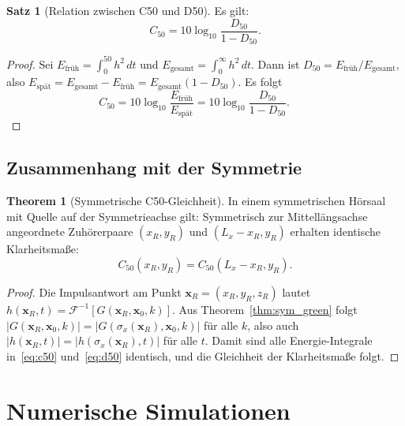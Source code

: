 ﻿\documentclass[12pt, a4paper]{article}
\theoremstyle{definition}
\newtheorem{satz}{Satz}[section]
\newtheorem{theorem}{Theorem}[section]
\theoremstyle{remark}
\newcommand{\Lx}{L_x}
\begin{document}
\begin{satz}[Relation zwischen C50 und D50]
\label{satz:c50_d50}
Es gilt:
\begin{equation}
  C_{50} = 10\log_{10}\frac{D_{50}}{1 - D_{50}}.
  \label{eq:c50_d50}
\end{equation}
\end{satz}

\begin{proof}
Sei $E_{\text{früh}} = \int_0^{50} h^2\,dt$ und $E_{\text{gesamt}} = \int_0^\infty h^2\,dt$.
Dann ist $D_{50} = E_{\text{früh}}/E_{\text{gesamt}}$, also
$E_{\text{spät}} = E_{\text{gesamt}} - E_{\text{früh}} = E_{\text{gesamt}}(1-D_{50})$.
Es folgt
\[
  C_{50} = 10\log_{10}\frac{E_{\text{früh}}}{E_{\text{spät}}}
  = 10\log_{10}\frac{D_{50}}{1-D_{50}}. \qquad 
\]
\end{proof}

\subsection{Zusammenhang mit der Symmetrie}

\begin{theorem}[Symmetrische C50-Gleichheit]
\label{thm:c50_sym}
In einem symmetrischen Hörsaal mit Quelle auf der Symmetrieachse gilt:
Symmetrisch zur Mittellängsachse angeordnete Zuhörerpaare
$(x_R, y_R) $ und $(\Lx - x_R, y_R)$ erhalten identische Klarheitsmaße:
\[
  C_{50}(x_R, y_R) = C_{50}(\Lx - x_R, y_R).
\]
\end{theorem}

\begin{proof}
Die Impulsantwort am Punkt $\mathbf{x}_R = (x_R, y_R, z_R)$ lautet
$h(\mathbf{x}_R, t) = \mathcal{F}^{-1}[G(\mathbf{x}_R, \mathbf{x}_0, k)]$.
Aus Theorem~\ref{thm:sym_green} folgt $|G(\mathbf{x}_R, \mathbf{x}_0,k)|
= |G(\sigma_x(\mathbf{x}_R), \mathbf{x}_0, k)|$ für alle $k$, also auch
$|h(\mathbf{x}_R, t)| = |h(\sigma_x(\mathbf{x}_R), t)|$ für alle $t$.
Damit sind alle Energie-Integrale in~\eqref{eq:c50} und~\eqref{eq:d50}
identisch, und die Gleichheit der Klarheitsmaße folgt. 
\end{proof}

\section{Numerische Simulationen}
\label{sec:simulation}
\end{document}
